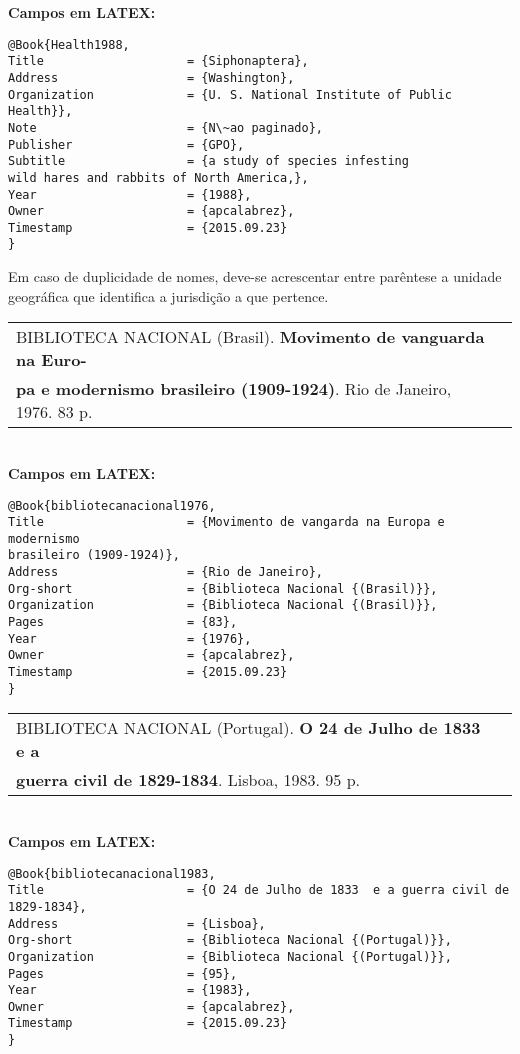 \textbf{Campos em LATEX:}

\begin{verbatim}
@Book{Health1988,
Title                    = {Siphonaptera},
Address                  = {Washington},
Organization             = {U. S. National Institute of Public Health}},
Note                     = {N\~ao paginado},
Publisher                = {GPO},
Subtitle                 = {a study of species infesting 
wild hares and rabbits of North America,},
Year                     = {1988},
Owner                    = {apcalabrez},
Timestamp                = {2015.09.23}
}
\end{verbatim}

Em caso de duplicidade de nomes, deve-se acrescentar entre par\^entese a unidade geogr\'afica que identifica a jurisdi\c{c}\~ao a que pertence. \\


\begin{tabular}{|l|c|} \hline
	BIBLIOTECA NACIONAL (Brasil). \textbf{Movimento de vanguarda na Euro-} \\ \textbf{pa e modernismo brasileiro (1909-1924)}. Rio de Janeiro, 1976.	83 p.   \\\hline
\end{tabular}\\

\textbf{Campos em LATEX:}

\begin{verbatim}
@Book{bibliotecanacional1976,
Title                    = {Movimento de vangarda na Europa e modernismo
brasileiro (1909-1924)},
Address                  = {Rio de Janeiro},
Org-short                = {Biblioteca Nacional {(Brasil)}},
Organization             = {Biblioteca Nacional {(Brasil)}},
Pages                    = {83},
Year                     = {1976},
Owner                    = {apcalabrez},
Timestamp                = {2015.09.23}
}
\end{verbatim}

\begin{tabular}{|l|c|} \hline
	BIBLIOTECA NACIONAL (Portugal). \textbf{O 24 de Julho de 1833 e a} \\ \textbf{guerra civil de 1829-1834}. Lisboa, 1983. 95 p.   \\\hline
\end{tabular}\\

\textbf{Campos em LATEX:}

\begin{verbatim}
@Book{bibliotecanacional1983,
Title                    = {O 24 de Julho de 1833  e a guerra civil de 
1829-1834},
Address                  = {Lisboa},
Org-short                = {Biblioteca Nacional {(Portugal)}},
Organization             = {Biblioteca Nacional {(Portugal)}},
Pages                    = {95},
Year                     = {1983},
Owner                    = {apcalabrez},
Timestamp                = {2015.09.23}
}
\end{verbatim}

